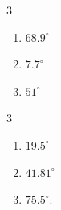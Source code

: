 \documentclass{ximera}
\begin{document}
\begin{multicols}{3}

\begin{enumerate}

\setcounter{enumi}{\value{HW}}

\item $68.9^{\circ}$

\item $7.7^{\circ}$

\item $51^{\circ}$

\setcounter{HW}{\value{enumi}}

\end{enumerate}

\end{multicols}

\begin{multicols}{3}

\begin{enumerate}

\setcounter{enumi}{\value{HW}}

\item $19.5^{\circ}$

\item  $41.81^{\circ}$

\item  $75.5^{\circ}$.

\setcounter{HW}{\value{enumi}}

\end{enumerate}

\end{multicols}
\end{document}
